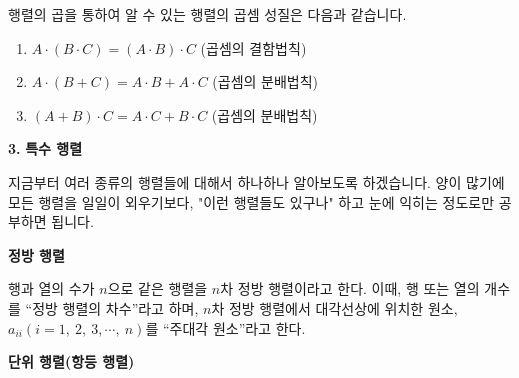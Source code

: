 \begin{flushleft}
    행렬의 곱을 통하여 알 수 있는 행렬의 곱셈 성질은 다음과 같습니다.
\end{flushleft}

\begin{tcolorbox}[colback = white, colframe = Theorem, title = \textmd{정리: 행렬의 곱셈 성질}]
    \begin{enumerate}
        \item $A \cdot (B \cdot C) = (A \cdot B) \cdot C$    (곱셈의 결함법칙)
        \item $A \cdot (B + C) = A \cdot B +A \cdot C$    (곱셈의 분배법칙)
        \item $(A + B) \cdot C = A \cdot C + B \cdot C$    (곱셈의 분배법칙)
    \end{enumerate}
\end{tcolorbox}

\newpage
\begin{flushleft}
    {\setmainfont[Path=FONT/]{KOPUBWORLD_DOTUM_PRO_BOLD.OTF} {\textcolor{header}{{\huge\textbf{3.}}}}}
    { {\textcolor{header}{{\huge\textbf{특수 행렬}}}}}
\end{flushleft}

\begin{flushleft}
    지금부터 여러 종류의 행렬들에 대해서 하나하나 알아보도록 하겠습니다. 양이 많기에 모든 행렬을 일일이 외우기보다, "이런 행렬들도 있구나" 하고 눈에 익히는 정도로만 공부하면 됩니다.
\end{flushleft}

\bigskip
\begin{flushleft}
    {\textcolor{subheader}{{\LARGE\textbf{정방 행렬}}}}
\end{flushleft}

\begin{tcolorbox}[colback = white, colframe = Definition, title = \textmd{정의: 정방 행렬}]
    행과 열의 수가 $n$으로 같은 행렬을 $n$차 정방 행렬이라고 한다. 이때, 행 또는 열의 개수를 “정방 행렬의 차수”라고 하며, $n$차 정방 행렬에서 대각선상에 위치한 원소, $a_{ii}(i = 1, \ 2, \ 3, \cdots, \ n)$를 “주대각 원소”라고 한다. 
\end{tcolorbox}

\bigskip
\begin{flushleft}
    {\textcolor{subheader}{{\LARGE\textbf{단위 행렬(항등 행렬)}}}}
\end{flushleft}

